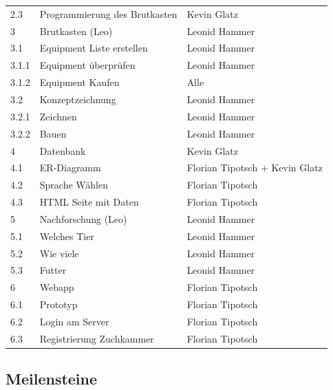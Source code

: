 \begin{table}[H]
\begin{tabular}{lll}
		2.3   & Programmierung des Brutkasten    & Kevin Glatz                    \\
		3     & Brutkasten (Leo)                 & Leonid Hammer                  \\
		3.1   & Equipment Liste erstellen        & Leonid Hammer                  \\
		3.1.1 & Equipment überprüfen             & Leonid Hammer                  \\
		3.1.2 & Equipment Kaufen                 & Alle                           \\
		3.2   & Konzeptzeichnung                 & Leonid Hammer                  \\
		3.2.1 & Zeichnen                         & Leonid Hammer                  \\
		3.2.2 & Bauen                            & Leonid Hammer                  \\
		
		4     & Datenbank                        & Kevin Glatz                    \\
		4.1   & ER-Diagramm                      & Florian Tipotsch + Kevin Glatz \\
		4.2   & Sprache Wählen                   & Florian Tipotsch               \\
		4.3   & HTML Seite mit Daten             & Florian Tipotsch               \\
		5     & Nachforschung (Leo)              & Leonid Hammer                  \\
		5.1   & Welches Tier                     & Leonid Hammer                  \\
		5.2   & Wie viele                        & Leonid Hammer                  \\
		5.3   & Futter                           & Leonid Hammer                  \\
		6     & Webapp                           & Florian Tipotsch               \\
		6.1   & Prototyp                         & Florian Tipotsch               \\
		6.2   & Login am Server                  & Florian Tipotsch               \\
		6.3   & Registrierung Zuchkammer         & Florian Tipotsch              
	\end{tabular}
\end{table}

\subsection{Meilensteine}


